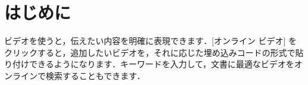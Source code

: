 \section{はじめに}
ビデオを使うと，伝えたい内容を明確に表現できます．[オンライン ビデオ] をクリックすると，追加したいビデオを，それに応じた埋め込みコードの形式で貼り付けできるようになります．キーワードを入力して，文書に最適なビデオをオンラインで検索することもできます．
